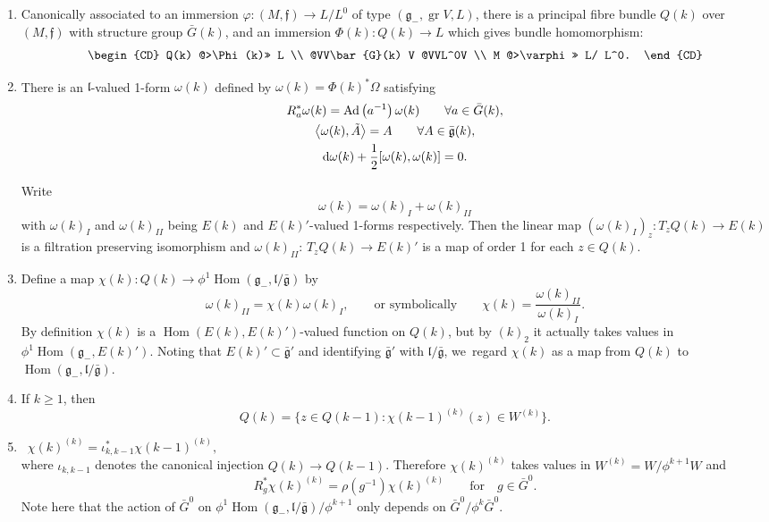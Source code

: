 \documentclass[pdftex]{sigma}%
\newcommand{\geneg}{\mathfrak g _-}
\newcommand{\gebar}{\bar{\mathfrak g}}
\newcommand{\f}{\mathfrak f}
\newcommand{\lf}{\mathfrak l}
\newcommand{\gr}{\operatorname{gr}}
\newcommand{\Hom}{\operatorname{Hom}}
\numberwithin{equation}{section}
\begin{document}
\begin{enumerate}\itemsep=0pt
\item[$(k)_1$] Canonically associated to an immersion
$\varphi\colon (M, \f ) \to L/L^0 $ of type $(\geneg,\gr V, L)$,
there is a principal fibre bundle $Q(k)$ over $(M, \f) $ with structure group $\bar{G} (k)$,
and an immersion $\Phi(k)\colon Q(k) \to L$ which gives bundle
homomorphism:
\[
\begin{CD}
Q(k) @>\Phi(k)>> L \\
@VV\bar{G}(k) V @VVL^0V \\
M @>\varphi>> L/ L^0.
\end{CD}
\]

\item[$(k)_2$]
There is an $\lf$-valued 1-form $\omega(k) $ defined by
$\omega (k) = \Phi(k)^* \Omega$ satisfying
\begin{gather*}
R_a ^* \omega(k) = {\rm Ad}\left(a^{-1}\right)\omega (k) \qquad \forall a \in \bar{G}(k),
\\
\big\langle \omega (k) , \tilde{A} \big\rangle = A \qquad \forall A \in \gebar(k),
\\
{\rm d}\omega(k) + \frac12 [ \omega(k) , \omega(k) ] = 0.
\end{gather*}

Write
\[
 \omega (k) = \omega (k)_I + \omega(k)_{II}
\]
with $\omega (k) _I $ and $\omega(k)_{II}$ being $E(k) $ and $E(k)'$-valued 1-forms
respectively. Then the li\-near map
$\left(\omega(k)_I \right)_z\colon T_z Q(k) \to E(k) $ is a filtration preserving isomorphism
and $\omega(k) _{II}$: $T_z Q(k) \to E(k)' $ is a map of order 1
for each $z \in Q(k)$.

\item[$(k)_3$]
Define a map $\chi(k)\colon Q(k) \to \phi^1\Hom(\geneg, \lf/\gebar)$ by
\[
\omega(k)_{II} = \chi (k) \omega(k)_I, \qquad \text{or symbolically}\qquad
\chi(k) = \frac {\omega(k)_{II}}{\omega(k)_I}.
\]
By definition $\chi(k)$ is a $\Hom(E(k), E(k)')$-valued function
on $Q(k)$, but by $(k)_2$ it actually takes values in
$\phi^1\Hom (\geneg, E(k)')$. Noting that $E(k)' \subset \gebar '$ and identifying $\gebar '$ with $\lf / \gebar $, we~regard $\chi(k)$ as a map from $Q(k)$ to $\Hom( \geneg, \lf/\gebar)$.

\item[$(k)_4$]
If $k \ge 1$, then
\[
Q(k) = \big\{ z \in Q(k-1)\colon \chi (k-1) ^{(k)} (z) \in W^{(k)} \big\}.
\]

\item[$(k)_5 $]
\qquad\ $\chi(k) ^{(k)} = \iota _{k, k-1} ^* \chi(k-1) ^{(k)}, $ \\
where $\iota_{k, k-1}$ denotes the canonical injection
$ Q(k) \to Q(k-1) $.
Therefore
$\chi (k) ^{(k)}$ takes values in $W^{(k)} = W / \phi^{k+1} W$
and
\[
R_g^* \chi(k) ^{(k)} = \rho \left(g^{-1}\right)\chi(k) ^{(k)}
\qquad \text{for}\quad g \in \bar{G}^0.
\]
Note here that the action
of $\bar{G}^0$ on $\phi^1\Hom(\geneg, \lf/\gebar) / \phi^{k+1}$ only depends on $\bar{G}^0/\phi^{k}\bar{G}^0$.


\end{enumerate}
\end{document}
